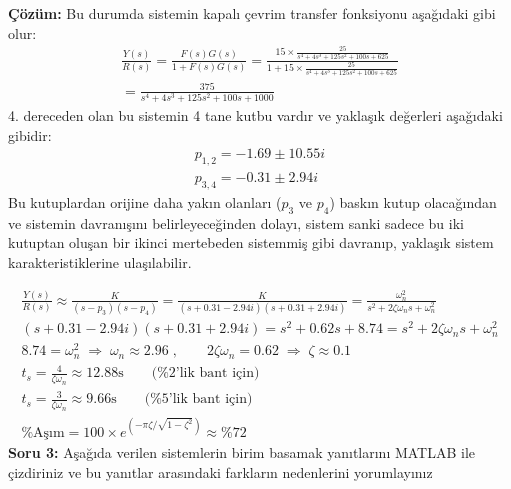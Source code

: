 \documentclass[a4paper,11pt]{article}
\begin{document}
\textbf{Çözüm:} Bu durumda sistemin kapalı çevrim transfer fonksiyonu aşağıdaki gibi olur:
\begin{gather*}
    \frac{Y(s)}{R(s)} = \frac{F(s)G(s)}{1 + F(s)G(s)} = \frac{15 \times \frac{25}{s^4 + 4s^3 + 125s^2 + 100s + 625}}{1 + 15 \times \frac{25}{s^4 + 4s^3 + 125s^2 + 100s + 625}} \\[.8em]
    = \frac{375}{s^4 + 4s^3 + 125 s^2 + 100s  + 1000}
\end{gather*}
4. dereceden olan bu sistemin 4 tane kutbu vardır ve yaklaşık değerleri aşağıdaki gibidir:
\begin{gather*}
    p_{1,2} = -1.69 \pm 10.55i\\
    p_{3,4} = -0.31 \pm 2.94i
\end{gather*}
Bu kutuplardan orijine daha yakın olanları ($p_3$ ve $p_4$) baskın kutup olacağından ve sistemin davranışını belirleyeceğinden dolayı, sistem sanki sadece bu iki kutuptan oluşan bir ikinci mertebeden sistemmiş gibi davranıp, yaklaşık sistem karakteristiklerine ulaşılabilir.

\begin{gather*}
    \frac{Y(s)}{R(s)} \approx \frac{K}{(s-p_3)(s-p_4)} = \frac{K}{(s+0.31-2.94i)(s+0.31+2.94i)} = \frac{\omega_n^2}{s^2 + 2\zeta\omega_n s + \omega_n^2}\\[.8em]
    (s + 0.31 - 2.94i)(s + 0.31 + 2.94i) = s^2 + 0.62s + 8.74 = s^2 + 2\zeta\omega_n s + \omega_n^2\\
    8.74 = \omega_n^2 \;\Rightarrow\; \omega_n \approx 2.96 \;,\qquad 2\zeta\omega_n = 0.62 \;\Rightarrow\; \zeta \approx 0.1 \\[1.2em]
    t_s = \frac{4}{\zeta\omega_n} \approx 12.88\mathrm{s} \qquad \text{(\%2'lik bant için)}\\
    t_s = \frac{3}{\zeta\omega_n} \approx 9.66\mathrm{s} \qquad \text{(\%5'lik bant için)}\\[1.2em]
    \text{\%Aşım} = 100 \times e^{(-\pi\zeta / \sqrt{1-\zeta^2})} \approx \%72
\end{gather*}
\newpage\textbf{Soru 3:} Aşağıda verilen sistemlerin birim basamak yanıtlarını MATLAB ile çizdiriniz ve bu yanıtlar arasındaki farkların nedenlerini yorumlayınız
\end{document}
